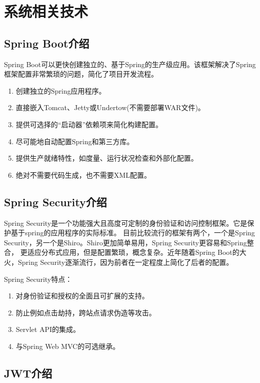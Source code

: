 
\chapter{系统相关技术}
\label{chap04}

\section{Spring Boot介绍}

Spring Boot可以更快创建独立的、基于Spring的生产级应用。该框架解决了Spring框架配置非常繁琐的问题，简化了项目开发流程\cite{.2019f}。

\begin{enumerate}
    \item 创建独立的Spring应用程序。
    \item 直接嵌入Tomcat、Jetty或Undertow(不需要部署WAR文件)。
    \item 提供可选择的“启动器”依赖项来简化构建配置。
    \item 尽可能地自动配置Spring和第三方库。
    \item 提供生产就绪特性，如度量、运行状况检查和外部化配置。
    \item 绝对不需要代码生成，也不需要XML配置。
\end{enumerate}

\section{Spring Security介绍}

Spring Security是一个功能强大且高度可定制的身份验证和访问控制框架。它是保护基于spring的应用程序的实际标准。
目前比较流行的框架有两个，一个是Spring Security，另一个是Shiro。Shiro更加简单易用，Spring Security更容易和Spring整合，
更适应分布式应用，但是配置繁琐，概念复杂。近年随着Spring Boot的大火，Spring Security逐渐流行，因为前者在一定程度上简化了后者的配置。

Spring Security特点：
\begin{enumerate}
    \item 对身份验证和授权的全面且可扩展的支持。
    \item 防止例如点击劫持，跨站点请求伪造等攻击。
    \item Servlet API的集成。
    \item 与Spring Web MVC的可选继承。
\end{enumerate}

\section{JWT介绍}


